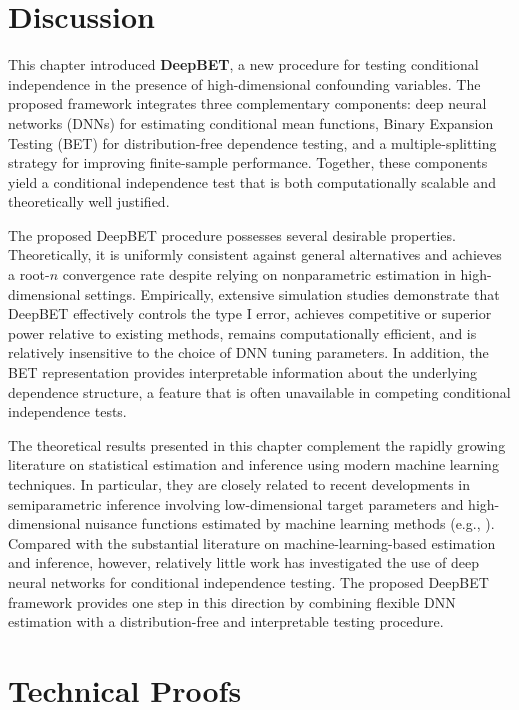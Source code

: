 \documentclass[12pt,reqno,oneside]{amsbook}
\theoremstyle{definition}
\theoremstyle{remark}
\begin{document}
\section{Discussion}
\label{discussion}

This chapter introduced \textbf{DeepBET}, a new procedure for testing conditional independence in the presence of high-dimensional confounding variables. The proposed framework integrates three complementary components: deep neural networks (DNNs) for estimating conditional mean functions, Binary Expansion Testing (BET) for distribution-free dependence testing, and a multiple-splitting strategy for improving finite-sample performance. Together, these components yield a conditional independence test that is both computationally scalable and theoretically well justified.

The proposed DeepBET procedure possesses several desirable properties. Theoretically, it is uniformly consistent against general alternatives and achieves a root-$n$ convergence rate despite relying on nonparametric estimation in high-dimensional settings. Empirically, extensive simulation studies demonstrate that DeepBET effectively controls the type I error, achieves competitive or superior power relative to existing methods, remains computationally efficient, and is relatively insensitive to the choice of DNN tuning parameters. In addition, the BET representation provides interpretable information about the underlying dependence structure, a feature that is often unavailable in competing conditional independence tests.

The theoretical results presented in this chapter complement the rapidly growing literature on statistical estimation and inference using modern machine learning techniques. In particular, they are closely related to recent developments in semiparametric inference involving low-dimensional target parameters and high-dimensional nuisance functions estimated by machine learning methods (e.g., \cite{Chernozhukov2018,Farrell2021}). Compared with the substantial literature on machine-learning-based estimation and inference, however, relatively little work has investigated the use of deep neural networks for conditional independence testing. The proposed DeepBET framework provides one step in this direction by combining flexible DNN estimation with a distribution-free and interpretable testing procedure.





\section{Technical Proofs}
\label{tech_proof}
\end{document}
